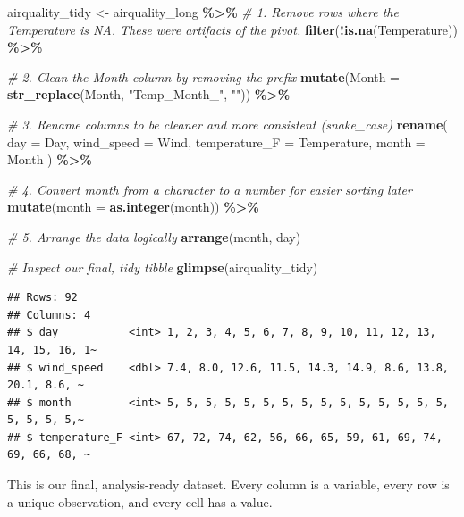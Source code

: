 \documentclass[
  11pt,
]{article}
\newenvironment{Shaded}{\begin{snugshade}}{\end{snugshade}}
\newcommand{\AttributeTok}[1]{\textcolor[rgb]{0.13,0.29,0.53}{#1}}
\newcommand{\CommentTok}[1]{\textcolor[rgb]{0.56,0.35,0.01}{\textit{#1}}}
\newcommand{\FunctionTok}[1]{\textcolor[rgb]{0.13,0.29,0.53}{\textbf{#1}}}
\newcommand{\NormalTok}[1]{#1}
\newcommand{\OtherTok}[1]{\textcolor[rgb]{0.56,0.35,0.01}{#1}}
\newcommand{\SpecialCharTok}[1]{\textcolor[rgb]{0.81,0.36,0.00}{\textbf{#1}}}
\newcommand{\StringTok}[1]{\textcolor[rgb]{0.31,0.60,0.02}{#1}}
\begin{document}
\begin{Shaded}
\begin{Highlighting}[]
\NormalTok{airquality\_tidy }\OtherTok{\textless{}{-}}\NormalTok{ airquality\_long }\SpecialCharTok{\%\textgreater{}\%}
  \CommentTok{\# 1. Remove rows where the Temperature is NA. These were artifacts of the pivot.}
  \FunctionTok{filter}\NormalTok{(}\SpecialCharTok{!}\FunctionTok{is.na}\NormalTok{(Temperature)) }\SpecialCharTok{\%\textgreater{}\%}
  
  \CommentTok{\# 2. Clean the \textquotesingle{}Month\textquotesingle{} column by removing the prefix}
  \FunctionTok{mutate}\NormalTok{(}\AttributeTok{Month =} \FunctionTok{str\_replace}\NormalTok{(Month, }\StringTok{"Temp\_Month\_"}\NormalTok{, }\StringTok{""}\NormalTok{)) }\SpecialCharTok{\%\textgreater{}\%}
  
  \CommentTok{\# 3. Rename columns to be cleaner and more consistent (snake\_case)}
  \FunctionTok{rename}\NormalTok{(}
    \AttributeTok{day =}\NormalTok{ Day,}
    \AttributeTok{wind\_speed =}\NormalTok{ Wind,}
    \AttributeTok{temperature\_F =}\NormalTok{ Temperature,}
    \AttributeTok{month =}\NormalTok{ Month}
\NormalTok{  ) }\SpecialCharTok{\%\textgreater{}\%}

  \CommentTok{\# 4. Convert month from a character to a number for easier sorting later}
  \FunctionTok{mutate}\NormalTok{(}\AttributeTok{month =} \FunctionTok{as.integer}\NormalTok{(month)) }\SpecialCharTok{\%\textgreater{}\%}
  
  \CommentTok{\# 5. Arrange the data logically}
  \FunctionTok{arrange}\NormalTok{(month, day)}

\CommentTok{\# Inspect our final, tidy tibble}
\FunctionTok{glimpse}\NormalTok{(airquality\_tidy)}
\end{Highlighting}
\end{Shaded}

\begin{verbatim}
## Rows: 92
## Columns: 4
## $ day           <int> 1, 2, 3, 4, 5, 6, 7, 8, 9, 10, 11, 12, 13, 14, 15, 16, 1~
## $ wind_speed    <dbl> 7.4, 8.0, 12.6, 11.5, 14.3, 14.9, 8.6, 13.8, 20.1, 8.6, ~
## $ month         <int> 5, 5, 5, 5, 5, 5, 5, 5, 5, 5, 5, 5, 5, 5, 5, 5, 5, 5, 5,~
## $ temperature_F <int> 67, 72, 74, 62, 56, 66, 65, 59, 61, 69, 74, 69, 66, 68, ~
\end{verbatim}

This is our final, analysis-ready dataset. Every column is a variable,
every row is a unique observation, and every cell has a value.
\end{document}
